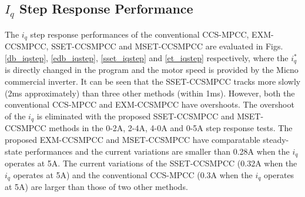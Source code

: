 \documentclass[a4paper, 8pt, twocolumn]{IEEEtran}
\begin{document}
\subsection{$I_q$ Step Response Performance}
The $i_q$ step response performances of the conventional CCS-MPCC, EXM-CCSMPCC, SSET-CCSMPCC and MSET-CCSMPCC are evaluated in Figs. \ref{db_iqstep}, \ref{edb_iqstep}, \ref{sset_iqstep} and \ref{et_iqstep} respectively, where the $i_q^*$ is directly changed in the program and the motor speed is provided by the Micno commercial inverter. It can be seen that the SSET-CCSMPCC tracks more slowly (2ms approximately) than three other methods (within 1ms). However, both the conventional CCS-MPCC and EXM-CCSMPCC have overshoots. The overshoot of the $i_q$ is eliminated with the proposed SSET-CCSMPCC and MSET-CCSMPCC methods in the 0-2A, 2-4A, 4-0A and 0-5A step response tests. The proposed EXM-CCSMPCC and MSET-CCSMPCC have comparatable steady-state performances and the current variations are smaller than 0.28A when the $i_q$ operates at 5A. The current variations of the SSET-CCSMPCC (0.32A when the $i_q$ operates at 5A) and the conventional CCS-MPCC (0.3A when the $i_q$ operates at 5A) are larger than those of two other methods.
\end{document}
